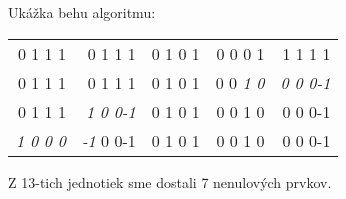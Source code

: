 \begin{priklad}
    Ukážka behu algoritmu: \\
    \begin{center}
        \begin{tabular}{rrrrr}
            0 1 1 1& 0 1 1 1& 0 1 0 1& 0 0 0 1& 1 1 1 1 \\
            0 1 1 1& 0 1 1 1& 0 1 0 1& 0 0 \emph{1 0}& \emph{0 0 0-1} \\
            0 1 1 1& \emph{1 0 0-1}& 0 1 0 1& 0 0 1 0& 0 0 0-1 \\
            \emph{1 0 0 0}&\emph{-1} 0 0-1& 0 1 0 1& 0 0 1 0& 0 0 0-1
        \end{tabular}
    \end{center}
    Z 13-tich jednotiek sme dostali 7 nenulových prvkov.
\end{priklad}
